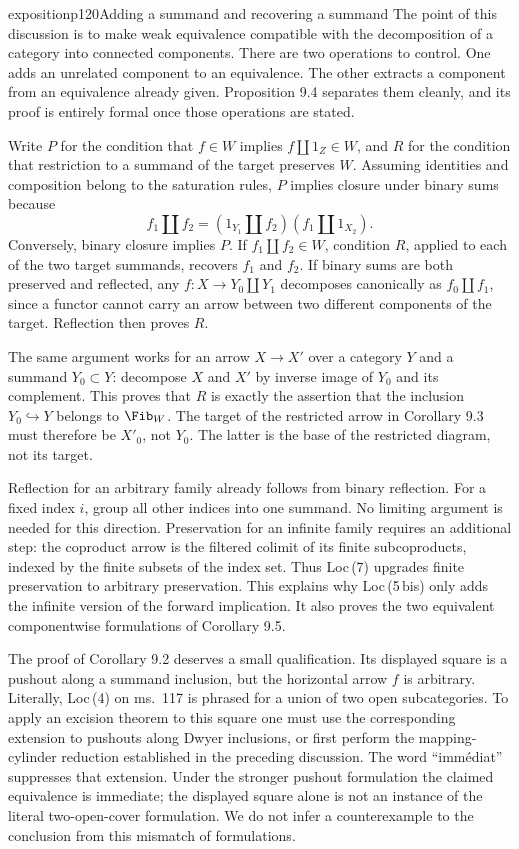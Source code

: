 \begin{dcomment}{exposition}{p120}{Adding a summand and recovering a summand}
The point of this discussion is to make weak equivalence compatible with the decomposition of a category into connected components. There are two operations to control. One adds an unrelated component to an equivalence. The other extracts a component from an equivalence already given. Proposition 9.4 separates them cleanly, and its proof is entirely formal once those operations are stated.

Write $P$ for the condition that $f\in W$ implies $f\amalg1_Z\in W$, and $R$ for the condition that restriction to a summand of the target preserves $W$. Assuming identities and composition belong to the saturation rules, $P$ implies closure under binary sums because
\[
 f_1\amalg f_2=(1_{Y_1}\amalg f_2)(f_1\amalg1_{X_2}).
\]
Conversely, binary closure implies $P$. If $f_1\amalg f_2\in W$, condition $R$, applied to each of the two target summands, recovers $f_1$ and $f_2$. If binary sums are both preserved and reflected, any $f:X\longrightarrow Y_0\amalg Y_1$ decomposes canonically as $f_0\amalg f_1$, since a functor cannot carry an arrow between two different components of the target. Reflection then proves $R$.

The same argument works for an arrow $X\longrightarrow X'$ over a category $Y$ and a summand $Y_0\subset Y$: decompose $X$ and $X'$ by inverse image of $Y_0$ and its complement. This proves that $R$ is exactly the assertion that the inclusion $Y_0\hookrightarrow Y$ belongs to $\Fib_W$. The target of the restricted arrow in Corollary 9.3 must therefore be $X'_0$, not $Y_0$. The latter is the base of the restricted diagram, not its target.

Reflection for an arbitrary family already follows from binary reflection. For a fixed index $i$, group all other indices into one summand. No limiting argument is needed for this direction. Preservation for an infinite family requires an additional step: the coproduct arrow is the filtered colimit of its finite subcoproducts, indexed by the finite subsets of the index set. Thus Loc\,(7) upgrades finite preservation to arbitrary preservation. This explains why Loc\,(5\,bis) only adds the infinite version of the forward implication. It also proves the two equivalent componentwise formulations of Corollary 9.5.

The proof of Corollary 9.2 deserves a small qualification. Its displayed square is a pushout along a summand inclusion, but the horizontal arrow $f$ is arbitrary. Literally, Loc\,(4) on ms.~117 is phrased for a union of two open subcategories. To apply an excision theorem to this square one must use the corresponding extension to pushouts along Dwyer inclusions, or first perform the mapping-cylinder reduction established in the preceding discussion. The word ``immédiat'' suppresses that extension. Under the stronger pushout formulation the claimed equivalence is immediate; the displayed square alone is not an instance of the literal two-open-cover formulation. We do not infer a counterexample to the conclusion from this mismatch of formulations.
\end{dcomment}

